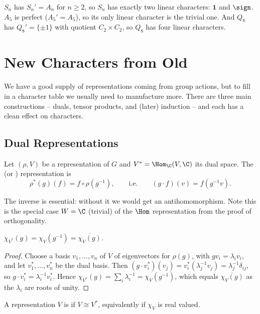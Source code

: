 \begin{example}
	$S_n$ has $S_n' = A_n$ for $n\geq 2$, so $S_n$ has exactly two linear characters: $\mathbf 1$ and $\sign$. $A_5$ is perfect ($A_5' = A_5$), so its only linear character is the trivial one. And $Q_8$ has $Q_8' = \{\pm 1\}$ with quotient $C_2\times C_2$, so $Q_8$ has four linear characters.
\end{example}

\section{New Characters from Old}

We have a good supply of representations coming from group actions, but to fill in a character table we usually need to manufacture more. There are three main constructions -- duals, tensor products, and (later) induction -- and each has a clean effect on characters.

\subsection{Dual Representations}

\begin{definition}
	Let $(\rho, V)$ be a representation of $G$ and $V^* = \Hom_\C(V,\C)$ its dual space. The  (or ) representation is
	$$\rho^*(g)(f) = f\circ\rho(g^{-1}), \qquad \text{i.e.} \qquad (g\cdot f)(v) = f(g^{-1}v).$$
\end{definition}

The inverse is essential: without it we would get an antihomomorphism. Note this is the special case $W = \C$ (trivial) of the $\Hom$ representation from the proof of orthogonality.

\begin{proposition}
	$\chi_{V^*}(g) = \chi_V(g^{-1}) = \overline{\chi_V(g)}$.
\end{proposition}
\begin{proof}
	Choose a basis $v_1,\dots,v_n$ of $V$ of eigenvectors for $\rho(g)$, with $gv_i = \lambda_i v_i$, and let $v_1^*,\dots,v_n^*$ be the dual basis. Then $(g\cdot v_i^*)(v_j) = v_i^*(\lambda_j^{-1}v_j) = \lambda_j^{-1}\delta_{ij}$, so $g\cdot v_i^* = \lambda_i^{-1}v_i^*$. Hence $\chi_{V^*}(g) = \sum_i\lambda_i^{-1} = \chi_V(g^{-1})$, which equals $\overline{\chi_V(g)}$ as the $\lambda_i$ are roots of unity.
\end{proof}

\begin{definition}
	A representation $V$ is  if $V \cong V^*$, equivalently if $\chi_V$ is real valued.
\end{definition}

